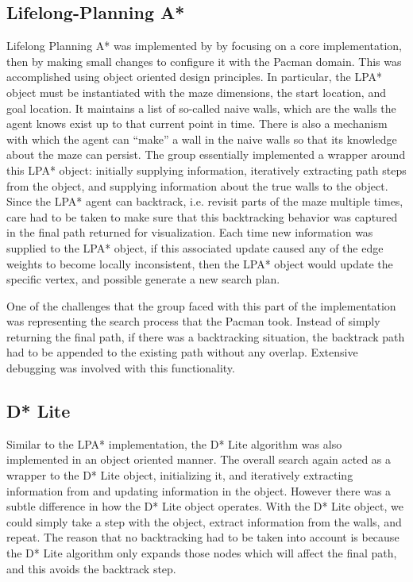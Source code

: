 \subsection{Lifelong-Planning A*}
	Lifelong Planning A* was implemented by by focusing on a core implementation, then by making small changes to configure it with the Pacman domain. This was accomplished using object oriented design principles. In particular, the LPA* object must be instantiated with the maze dimensions, the start location, and goal location. It maintains a list of so-called naive walls, which are the walls the agent knows exist up to that current point in time. There is also a mechanism with which the agent can ``make'' a wall in the naive walls so that its knowledge about the maze can persist. The group essentially implemented a wrapper around this LPA* object: initially supplying information, iteratively extracting path steps from the object, and supplying information about the true walls to the object. Since the LPA* agent can backtrack, i.e. revisit parts of the maze multiple times, care had to be taken to make sure that this backtracking behavior was captured in the final path returned for visualization. Each time new information was supplied to the LPA* object, if this associated update caused any of the edge weights to become locally inconsistent, then the LPA* object would update the specific vertex, and possible generate a new search plan.
	
	One of the challenges that the group faced with this part of the implementation was representing the search process that the Pacman took. Instead of simply returning the final path, if there was a backtracking situation, the backtrack path had to be appended to the existing path without any overlap. Extensive debugging was involved with this functionality.
	

\subsection{D* Lite}
	Similar to the LPA* implementation, the D* Lite algorithm was also implemented in an object oriented manner. The overall search again acted as a wrapper to the D* Lite object, initializing it, and iteratively extracting information from and updating information in the object. However there was a subtle difference in how the D* Lite object operates. With the D* Lite object, we could simply take a step with the object, extract information from the walls, and repeat. The reason that no backtracking had to be taken into account is because the D* Lite algorithm only expands those nodes which will affect the final path, and this avoids the backtrack step.
	
